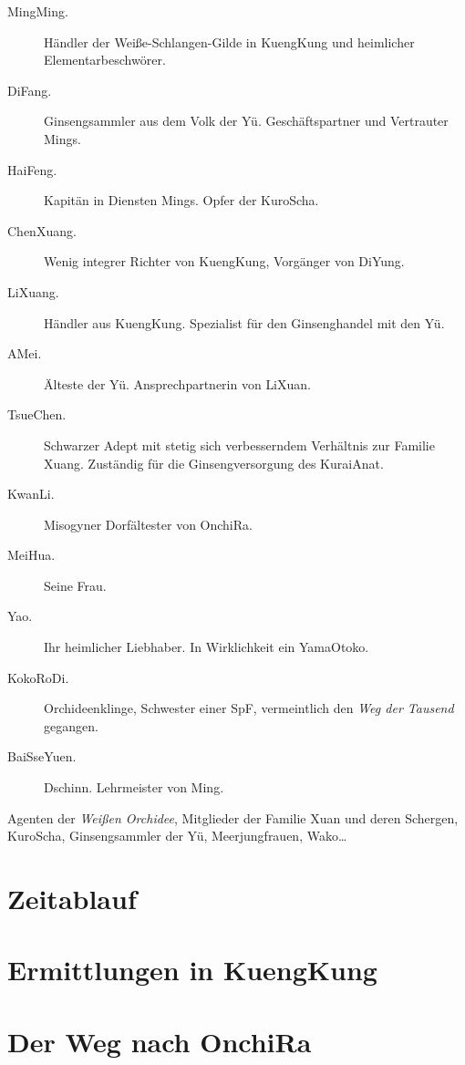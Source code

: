 \documentclass[12pt,a4paper,germanpar]{scrartcl}
\begin{document}
\begin{description}
\item[MingMing.] Händler der Weiße-Schlangen-Gilde in KuengKung und
  heimlicher Elementarbeschwörer.
\item[DiFang.] Ginsengsammler aus dem Volk der Yü. Geschäftspartner
  und Vertrauter Mings.
\item[HaiFeng.] Kapitän in Diensten Mings. Opfer der KuroScha.
\item[ChenXuang.] Wenig integrer Richter von KuengKung, Vorgänger von
  DiYung.
\item[LiXuang.] Händler aus KuengKung. Spezialist für den
  Ginsenghandel mit den Yü.
\item[AMei.] Älteste der Yü. Ansprechpartnerin von LiXuan.
\item[TsueChen.] Schwarzer Adept mit stetig sich verbesserndem
  Verhältnis zur Familie Xuang. Zuständig für die Ginsengversorgung
  des KuraiAnat.
\item[KwanLi.] Misogyner Dorfältester von OnchiRa.
\item[MeiHua.] Seine Frau.
\item[Yao.] Ihr heimlicher Liebhaber. In Wirklichkeit ein YamaOtoko.
\item[KokoRoDi.] Orchideenklinge, Schwester einer SpF, vermeintlich
  den \emph{Weg der Tausend} gegangen.
\item[BaiSseYuen.] Dschinn. Lehrmeister von Ming.
\end{description}

Agenten der \emph{Weißen Orchidee}, Mitglieder der Familie Xuan und
deren Schergen, KuroScha, Ginsengsammler der Yü, Meerjungfrauen, Wako\dots

\section{Zeitablauf}


\section{Ermittlungen in KuengKung}

\section{Der Weg nach OnchiRa}


\end{document}
